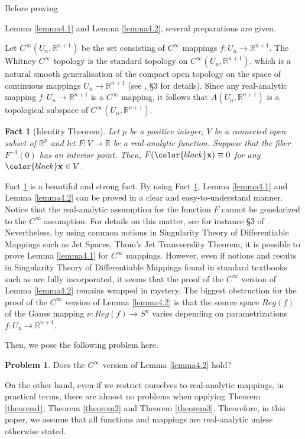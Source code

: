 \documentclass{amsart}
\newtheorem{fact}{Fact}
\theoremstyle{definition}
\theoremstyle{definition}
\theoremstyle{definition}
\newtheorem{problem}{Problem}
\newcommand{\ch}[1]{{\color{black} #1}}
\begin{document}
Before proving {\color{black}Lemma \ref{lemma4.1} and Lemma \ref{lemma4.2},  
several preparations are given.    
\par 
Let $C^\infty\left(U_n, \mathbb{R}^{n+1}\right)$ be the set consisting of 
$C^\infty$ mappings $f: U_n\to \mathbb{R}^{n+1}$.    
The Whitney $C^\infty$ topology is the standard topology 
on $C^\infty(U_n, \mathbb{R}^{n+1})$, 
which is a natural smooth generalisation of the compact open topology 
on the space of continuous mappings 
$U_n \to \mathbb{R}^{n+1}$ (see \cite{Golubitski_Guillemin}, \S 3 for details).
Since any real-analytic mapping $f: U_n\to \mathbb{R}^{n+1}$ is a 
$C^\infty$ mapping, it follows that 
$A(U_n, \mathbb{R}^{n+1})$ is a topological subspace of 
$C^\infty(U_n, \mathbb{R}^{n+1})$.   
\begin{fact}[Identity Theorem]\label{identity_theorem}
Let $p$ be a positive integer,  
$V$ be a connected open subset of $\mathbb{R}^p$ and 
let $F: V\to \mathbb{R}$ be a real-analytic function.   
Suppose that the fiber $F^{-1}(0)$ has an interior point.   
Then, $F({\color{black}\bf x})\equiv 0$ for any ${\color{black}\bf x}\in V$.   
\end{fact}
Fact \ref{identity_theorem} is a beautiful and strong 
fact.   By using Fact \ref{identity_theorem}, Lemma \ref{lemma4.1} and 
Lemma \ref{lemma4.2} can be proved 
in a clear and easy-to-understand manner.    
Notice that the real-analytic assumption for the function $F$ 
cannot be genelarized to the $C^\infty$ assumption.   
For details on this matter, see for instance \S 3 of \cite{brocker}.     
Nevertheless, by using common notions in Singularity Theory of 
Differentiable Mappings such as Jet Spaces, Thom's Jet Transverslity Theorem,  
it is possible to prove Lemma \ref{lemma4.1} 
for $C^\infty$ mappings.    
However, even if notions and results 
in Singularity Theory of Differentiable Mappings found in 
standard textbooks such as \cite{arnoldetall, Golubitski_Guillemin} 
are fully incorporated, 
it seems that the proof of \ch{the}
$C^\infty$ version of Lemma \ref{lemma4.2} 
remains wrapped in mystery.     
The biggest obstruction for the proof of \ch{the} $C^\infty$ version 
of Lemma \ref{lemma4.2} is that 
the source space $Reg(f)$ of \ch{the} Gauss mapping $\nu: Reg(f)\to S^n$ varies 
depending on parametrizations $f: U_n\to \mathbb{R}^{n+1}$.  
{\color{black} 
Then, we pose the following problem here.   
\begin{problem}\label{problem2} 
Does the $C^\infty$ version 
of Lemma \ref{lemma4.2} hold?
\end{problem}
}
{\color{black}On the other hand}, 
even if we restrict ourselves to real-analytic mappings, 
in practical terms, there are almost no problems when applying 
Theorem \ref{theorem1}, Theorem \ref{theorem2} and Theorem \ref{theorem3}.    
Theorefore, in this paper, 
we assume that all functions and mappings are real-analytic 
unless otherwise stated.    
}    
\end{document}
